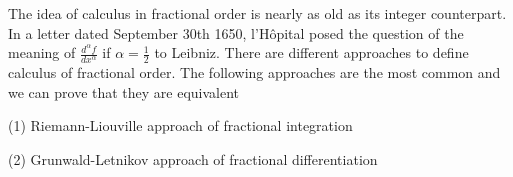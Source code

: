 \documentclass[12pt]{article}
\begin{document}
The idea of calculus in fractional order is nearly as old as its integer counterpart. In a letter dated September 30th 1650, l'H\^{o}pital posed the question of the meaning of $\displaystyle{\frac{d^\alpha f}{dx^\alpha}}$ if $\displaystyle{\alpha=\frac{1}{2}}$ to Leibniz. 
There are different approaches to define calculus of fractional order. The following approaches are the most common and we can prove that they are equivalent 

(1) Riemann-Liouville approach of fractional integration

(2) Grunwald-Letnikov approach of fractional differentiation

\end{document}
